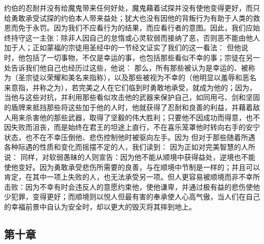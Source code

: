 约伯的忍耐并没有给魔鬼带来任何好处，魔鬼藉着试探并没有使他变得更好，而只给勇敢承受试探的约伯本人带来益处；犹大也没有因他的背叛行为有助于人类的救恩而免于永罚。因为我们不应看行为的结果，而应看行者的意图。因此，我们应始终持守这一主张：除非人因自己的怠惰或心灵软弱而接纳了恶，否则恶不能由他人加于人；正如蒙福的宗徒用圣经中的一节经文证实了我们的这一看法： 但他说时，他包括了一切事物，不仅是幸运的事，也包括那些看似不幸的事；宗徒在另一处告诉我们他自己也经历过这些，他说： 那么，所有那些被认为是幸运的、被称为（圣宗徒以荣耀和美名来指称），以及那些被视为不幸的（他明显以羞辱和恶名来意指，并称之为），若完美之人在它们临到时勇敢地承受，就成为他的；因为，当他与这些对抗，并利用那些看似攻击他的武器来保护自己，如同用弓、剑和坚固的盾牌来抵挡那些将这些加于他的人时，他就获得了忍耐和良善的利益，并藉着敌人用来杀害他的那些武器，取得了坚毅的伟大胜利；只要他不因成功而得意，也不因失败而沮丧，而是始终在君王的坦途上直行，不在喜乐笼罩他时转向右手的安宁状态，也不在不幸压倒他、悲伤控制他时被驱向左手。因为 但对于那些随着所遇各种际遇的性质和变化而摇摆不定的人，我们读到： 因为正如对完美智慧的人所说： 同样，对软弱愚昧的人则宣告：因为他不能从顺境中获得益处，逆境也不能使他变好。因为勇敢承受悲伤所需要的良善，与在顺境中节制是一样的；并且可以肯定，在其中一项上失败的人，也无法承受另一项。但人更容易被顺境而非不幸所击败：因为不幸有时会违反人的意愿约束他，使他谦卑，并通过极有益的悲伤使他少犯罪，变得更好；而顺境则以悦人但最有害的奉承使人心高气傲，当人们在自己的幸福前景中自认为安全时，却以更大的毁灭将其摔到地上。\par


\subsection{第十章}

\par

